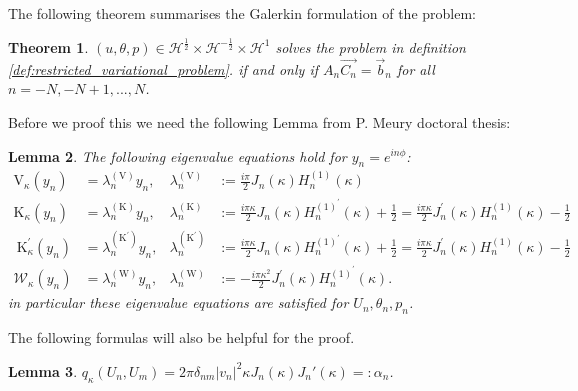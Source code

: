 \documentclass[10pt,journal,compsoc, onecolumn]{IEEEtran}
\newtheorem{theorem}{Theorem}[section]
\newtheorem{lemma}[theorem]{Lemma}
\begin{document}
The following theorem summarises the Galerkin formulation of the problem: 
\begin{theorem}
    \label{def:galerkin_matrix}
    \((u, \theta, p) \in  \mathcal{H}^{\frac{1}{2}} \times \mathcal{H}^{-\frac{1}{2}} \times \mathcal{H}^{1}\) solves the problem in definition \ref{def:restricted_variational_problem}.
    if and only if $A_n\vec{C_n} = \vec{b}_n$ for all  $n = -N, -N + 1, ..., N$. 
\end{theorem}

Before we proof this we need the following Lemma from P. Meury doctoral thesis: 
\begin{lemma}
    The following eigenvalue equations hold for $y_n = e^{i n \phi}$:
    $$
    \begin{aligned} 
        \mathrm{V}_{\kappa}\left(y_{n}\right) &=\lambda_{n}^{(\mathrm{V})} y_{n}, & \lambda_{n}^{(\mathrm{V})} &:=\frac{i \pi}{2} J_{n}(\kappa) H_{n}^{(1)}(\kappa) \\ 
        \mathrm{K}_{\kappa}\left(y_{n}\right) &=\lambda_{n}^{(\mathrm{K})} y_{n}, & \lambda_{n}^{(\mathrm{K})} &:=\frac{i \pi \kappa}{2} J_{n}(\kappa) H_{n}^{(1)^{\prime}}(\kappa)+\frac{1}{2}=\frac{i \pi \kappa}{2} J_{n}^{\prime}(\kappa) H_{n}^{(1)}(\kappa)-\frac{1}{2} \\ 
        \mathrm{~K}_{\kappa}^{\prime}\left(y_{n}\right) &=\lambda_{n}^{\left(\mathrm{K}^{\prime}\right)} y_{n}, & \lambda_{n}^{\left(\mathrm{K}^{\prime}\right)} &:=\frac{i \pi \kappa}{2} J_{n}(\kappa) H_{n}^{(1)^{\prime}}(\kappa)+\frac{1}{2}=\frac{i \pi \kappa}{2} J_{n}^{\prime}(\kappa) H_{n}^{(1)}(\kappa)-\frac{1}{2} \\ 
        \mathcal{W}_{\kappa}\left(y_{n}\right) &=\lambda_{n}^{(\mathrm{W})} y_{n}, & \lambda_{n}^{(\mathrm{W})} &:= - \frac{i \pi \kappa^{2}}{2} J_{n}^{\prime}(\kappa) H_{n}^{(1)^{\prime}}(\kappa).
    \end{aligned}
    $$
    in particular these eigenvalue equations are satisfied for $U_n, \theta_n, p_n$.
\end{lemma}
The following formulas will also be helpful for the proof.
\begin{lemma}
    $q_\kappa(U_n, U_m) = 2 \pi  \delta_{nm}|v_n|^2\kappa  J_n(\kappa ) J_n'(\kappa ) =: \alpha_n$.
\end{lemma}
\end{document}
